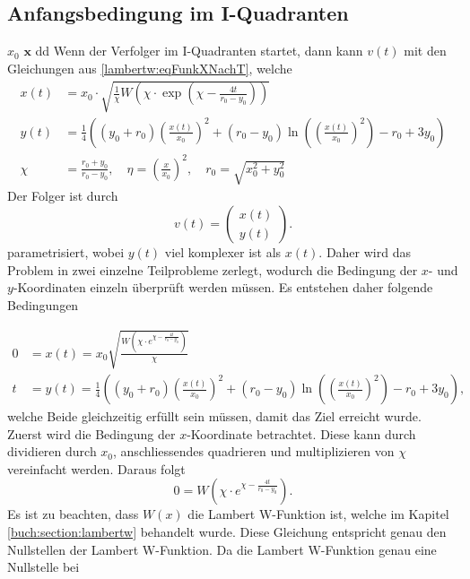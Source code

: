 \subsection{Anfangsbedingung im \RN{1}-Quadranten}
%
$ x_0$ $\boldsymbol{x}$ dd
Wenn der Verfolger im \RN{1}-Quadranten startet, dann kann $v(t)$ mit den Gleichungen aus \eqref{lambertw:eqFunkXNachT}, welche
\begin{align*}
    x\left(t\right)
    &=
    x_0\cdot\sqrt{\frac{1}{\chi}W\left(\chi\cdot \exp(\chi-\frac{4t}{r_0-y_0})\right)} \\
    y(t)
    &=
    \frac{1}{4}\left(\left(y_0+r_0\right)\left(\frac{x(t)}{x_0}\right)^2+\left(r_0-y_0\right)\operatorname{ln}\left(\left(\frac{x(t)}{x_0}\right)^2\right)-r_0+3y_0\right)\\
    \chi
    &=
    \frac{r_0+y_0}{r_0-y_0}, \quad
    \eta
    =
    \left(\frac{x}{x_0}\right)^2,\quad
    r_0
    =
    \sqrt{x_0^2+y_0^2}
\end{align*}
%
Der Folger ist durch
\begin{equation}
    v(t)
    =
    \left( \begin{array}{c} x(t) \\ y(t) \end{array} \right)
    \text{.}
\end{equation}
%
parametrisiert, wobei $y(t)$ viel komplexer ist als $x(t)$.
Daher wird das Problem in zwei einzelne Teilprobleme zerlegt, wodurch die Bedingung der $x$- und $y$-Koordinaten einzeln überprüft werden müssen. Es entstehen daher folgende Bedingungen

\begin{align*}
    0
    &=
    x(t)
    =
    x_0\sqrt{\frac{W\left(\chi\cdot e^{\chi-\frac{4t}{r_0-y_0}}\right)}{\chi}}
    \\
    t
    &=
    y(t)
    =
    \frac{1}{4}\left(\left(y_0+r_0\right)\left(\frac{x(t)}{x_0}\right)^2+\left(r_0-y_0\right)\operatorname{ln}\left(\left(\frac{x(t)}{x_0}\right)^2\right)-r_0+3y_0\right)\text{,}
\end{align*}
%
welche Beide gleichzeitig erfüllt sein müssen, damit das Ziel erreicht wurde.
Zuerst wird die Bedingung der $x$-Koordinate betrachtet.
Diese kann durch dividieren durch $x_0$, anschliessendes quadrieren und multiplizieren von $\chi$ vereinfacht werden. Daraus folgt 
\begin{equation}
	0
	=
	W\left(\chi\cdot e^{\chi-\frac{4t}{r_0-y_0}}\right)
	\text{.}
\end{equation}
%
Es ist zu beachten, dass $W(x)$ die Lambert W-Funktion ist, welche im Kapitel  \eqref{buch:section:lambertw} behandelt wurde.
Diese Gleichung entspricht genau den Nullstellen der Lambert W-Funktion. Da die Lambert W-Funktion genau eine Nullstelle bei

